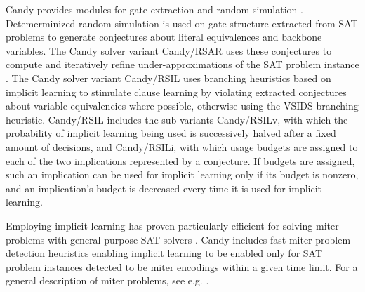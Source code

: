 \documentclass[conference]{IEEEtran}
\begin{document}
Candy provides modules for gate extraction \cite{Iser:2015:GateRecognition} and random simulation \cite{krohm1996use}.
Detemerminized random simulation is used on gate structure extracted from SAT problems to generate conjectures about literal equivalences and backbone variables.
The Candy solver variant Candy/RSAR uses these conjectures to compute and iteratively refine under-approximations of the SAT problem instance \cite{Kutzer:2016:Thesis}.
The Candy solver variant Candy/RSIL uses branching heuristics based on implicit learning \cite{Kutzer:2016:Thesis,DBLP:journals/jucs/LuWCMH04} to stimulate clause learning by violating extracted conjectures about variable equivalencies where possible, otherwise using the VSIDS branching heuristic.
Candy/RSIL includes the sub-variants Candy/RSILv, with which the probability of implicit learning being used is successively halved after a fixed amount of decisions, and Candy/RSILi, with which usage budgets are assigned to each of the two implications represented by a conjecture.
If budgets are assigned, such an implication can be used for implicit learning only if its budget is nonzero, and an implication's budget is decreased every time it is used for implicit learning.

Employing implicit learning has proven particularly efficient for solving miter problems with general-purpose SAT solvers \cite{Kutzer:2016:Thesis}.
Candy includes fast miter problem detection heuristics enabling implicit learning to be enabled only for SAT problem instances detected to be miter encodings within a given time limit.
For a general description of miter problems, see e.g. \cite{hwmcc12Bench}.


%

\end{document}
